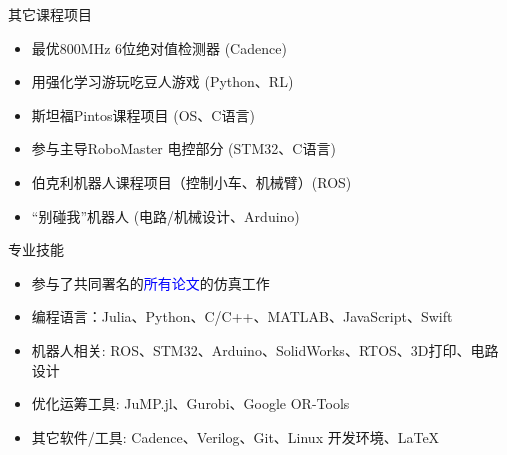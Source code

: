 \documentclass{resume} %
\begin{document}
\begin{rSection}{其它课程项目}
    \begin{multicols}{2} 
    \begin{itemize}
        \item 最优800MHz 6位绝对值检测器 (Cadence)
        \item 用强化学习游玩吃豆人游戏 (Python、RL) 
        \item 斯坦福Pintos课程项目 (OS、C语言)
        \item 参与主导RoboMaster 电控部分 (STM32、C语言)
        \item 伯克利机器人课程项目（控制小车、机械臂）(ROS) %
        \item ``别碰我''机器人 (电路/机械设计、Arduino)
    \end{itemize}
    \end{multicols}  %
    \vspace{-5mm}
\end{rSection}

\begin{rSection}{专业技能}
    \begin{itemize}
        \item 参与了共同署名的\textcolor{blue}{所有论文}的仿真工作
        \item 编程语言：Julia、Python、C/C++、MATLAB、JavaScript、Swift
        \item 机器人相关: ROS、STM32、Arduino、SolidWorks、RTOS、3D打印、电路设计
        \item 优化运筹工具: JuMP.jl、Gurobi、Google OR-Tools
        \item 其它软件/工具: Cadence、Verilog、Git、Linux 开发环境、LaTeX
    \end{itemize} 
\end{rSection}



\end{document}
